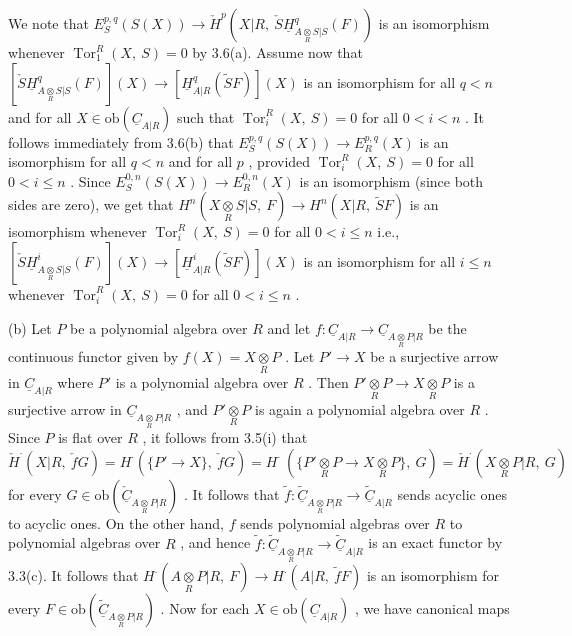 We note that  $E^{p,q}_{S}(S(X)) \to \check{H}^{p}(X|R,\ \check{S}\underline{H}^{q}_{A\underset{R}{\otimes}S|S}(F))$  is an isomorphism whenever $\operatorname{Tor}^{R}_{1}(X,\ S) = 0$  by 3.6(a). Assume now that $[\check{S}\underline{H}^{q}_{A\underset{R}{\otimes}S|S}(F)](X) \to [\underline{H}^{q}_{A|R}(\widetilde{S}F)](X)$  is an isomorphism for all  $q < n$  and for all $X \in \mathrm{ob}(\underline{C}_{A|R})$  such that  $\operatorname{Tor}^{R}_{i}(X,\ S) = 0$  for all  $0 < i < n$ . It follows immediately from 3.6(b) that  $E^{p,q}_{S}(S(X)) \to E^{p,q}_{R}(X)$  is an isomorphism for all  $q < n$ and for all  $p$ , provided  $\operatorname{Tor}^{R}_{i}(X,\ S) = 0$  for all  $0 < i \leq n$ . Since $E^{0,n}_{S}(S(X)) \to E^{0,n}_{R}(X)$  is an isomorphism (since both sides are zero), we get that $H^{n}(X\underset{R}{\otimes}S|S,\ F) \to H^{n}(X|R,\ \widetilde{S}F)$  is an isomorphism whenever  $\operatorname{Tor}^{R}_{i}(X,\ S) = 0$  for all $0 < i \leq n$  i.e.,  $[\check{S}\underline{H}^{i}_{A\underset{R}{\otimes}S|S}(F)](X) \to [\underline{H}^{i}_{A|R}(\widetilde{S}F)](X)$  is an isomorphism for all $i \leq n$  whenever  $\operatorname{Tor}^{R}_{i}(X,\ S) = 0$  for all  $0 < i \leq n$ .

(b)  Let  $P$  be a polynomial algebra over  $R$  and  let $f : \underline{C}_{A|R} \to \underline{C}_{A\underset{R}{\otimes}P|R}$  be the continuous functor given by  $f(X) = X\underset{R}{\otimes}P$ . Let  $P' \to X$ be a surjective arrow in  $\underline{C}_{A|R}$  where  $P'$  is a polynomial algebra over  $R$ . Then $P'\underset{R}{\otimes}P \to X\underset{R}{\otimes}P$  is a surjective arrow in  $\underline{C}_{A\underset{R}{\otimes}P|R}$ , and  $P'\underset{R}{\otimes}P$  is again a polynomial algebra over  $R$ . Since  $P$  is flat over  $R$ , it follows from 3.5(i) that $\check{H}^{\cdot}(X|R,\ \check{f}G) = H^{\cdot}(\{P' \to X\},\ \check{f}G) = H^{\cdot}\ (\{P'\underset{R}{\otimes}P \to X\underset{R}{\otimes}P\},\ G) = \check{H}^{\cdot}(X\underset{R}{\otimes}P|R,\ G)$ for every  $G \in \mathrm{ob}(\underline{\check{C}}_{A\underset{R}{\otimes}P|R})$ . It follows that  $\widetilde{f} : \underline{\widetilde{C}}_{A\underset{R}{\otimes}P|R} \to \underline{\widetilde{C}}_{A|R}$  sends acyclic ones to acyclic ones. On the other hand,  $f$  sends polynomial algebras over  $R$  to polynomial algebras over  $R$ , and hence  $\widetilde{f} : \underline{\widetilde{C}}_{A\underset{R}{\otimes}P|R} \to\!\underline{\widetilde{C}}_{A|R}$  is an exact functor by 3.3(c). It follows that  $H^{\cdot}(A\underset{R}{\otimes}P|R,\ F) \to H^{\cdot}(A|R,\ \widetilde{f}F)$  is an isomorphism for every $F \in \mathrm{ob}(\underline{\widetilde{C}}_{A\underset{R}{\otimes}P|R})$ . Now for each  $X \in \mathrm{ob}(\underline{C}_{A|R})$ , we have canonical maps

